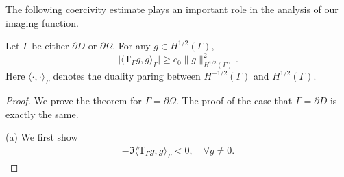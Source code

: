 \documentclass[final]{siamltex}
\begin{document}
The following coercivity estimate plays an important role in the analysis of our imaging function.
\begin{lemma} \label{mo coercivity}
Let $\Gamma$ be either $\partial D$ or $\partial \Omega$.
For any $g \in H^{1/2}(\Gamma)$,
\begin{equation}
\big| \langle  \mathrm{T}_\Gamma g,g \rangle_\Gamma \big| \ge c_0 \|g\|^2_{H^{1/2}(\Gamma)}.
\end{equation}
Here $\langle \cdot, \cdot \rangle_\Gamma$ denotes the duality paring between $H^{-1/2}(\Gamma)$ and $H^{1/2}(\Gamma)$.
\end{lemma}
\begin{proof}
We prove the theorem for $\Gamma=\partial \Omega$. The proof of the case that $\Gamma=\partial D$ is exactly the same.

(a) We first show \begin{eqnarray} \label{mo coercivity proof eqn1}
-\Im \langle  \mathrm{T}_\Gamma g,g \rangle_\Gamma   <0, \quad \forall g\not=0.
\end{eqnarray}



\end{proof}
\end{document}
